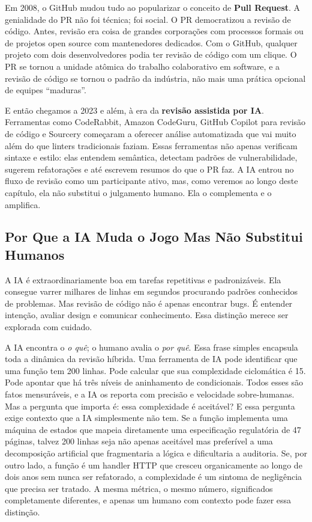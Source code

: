 Em 2008, o GitHub mudou tudo ao popularizar o conceito de \textbf{Pull Request}. A
genialidade do PR não foi técnica; foi social. O PR democratizou a revisão de
código. Antes, revisão era coisa de grandes corporações com processos formais ou de
projetos open source com mantenedores dedicados. Com o GitHub, qualquer projeto com
dois desenvolvedores podia ter revisão de código com um clique. O PR se tornou a
unidade atômica do trabalho colaborativo em software, e a revisão de código se tornou
o padrão da indústria, não mais uma prática opcional de equipes ``maduras''.

E então chegamos a 2023 e além, à era da \textbf{revisão assistida por IA}.
Ferramentas como CodeRabbit, Amazon CodeGuru, GitHub Copilot para revisão de código
e Sourcery começaram a oferecer análise automatizada que vai muito além do que linters
tradicionais faziam. Essas ferramentas não apenas verificam sintaxe e estilo: elas
entendem semântica, detectam padrões de vulnerabilidade, sugerem refatorações e até
escrevem resumos do que o PR faz. A IA entrou no fluxo de revisão como um participante
ativo, mas, como veremos ao longo deste capítulo, ela não substitui o julgamento
humano. Ela o complementa e o amplifica.

\subsection{Por Que a IA Muda o Jogo Mas Não Substitui Humanos}

A IA é extraordinariamente boa em tarefas repetitivas e padronizáveis. Ela
consegue varrer milhares de linhas em segundos procurando padrões conhecidos
de problemas. Mas revisão de código não é apenas encontrar bugs. É entender
intenção, avaliar design e comunicar conhecimento. Essa distinção merece
ser explorada com cuidado.

A IA encontra o \textit{o quê}; o humano avalia o \textit{por quê}. Essa frase
simples encapsula toda a dinâmica da revisão híbrida. Uma ferramenta de IA pode
identificar que uma função tem 200 linhas. Pode calcular que sua complexidade
ciclomática é 15. Pode apontar que há três níveis de aninhamento de condicionais.
Todos esses são fatos mensuráveis, e a IA os reporta com precisão e velocidade
sobre-humanas. Mas a pergunta que importa é: essa complexidade é aceitável? E essa
pergunta exige contexto que a IA simplesmente não tem. Se a função implementa uma
máquina de estados que mapeia diretamente uma especificação regulatória de 47 páginas,
talvez 200 linhas seja não apenas aceitável mas preferível a uma decomposição
artificial que fragmentaria a lógica e dificultaria a auditoria. Se, por outro lado,
a função é um handler HTTP que cresceu organicamente ao longo de dois anos sem nunca
ser refatorado, a complexidade é um sintoma de negligência que precisa ser tratado.
A mesma métrica, o mesmo número, significados completamente diferentes, e apenas um
humano com contexto pode fazer essa distinção.

